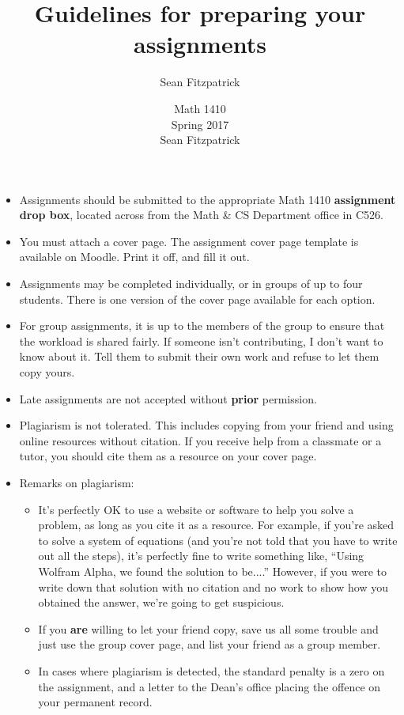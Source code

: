 \documentclass[letterpaper,12pt]{article}
\author{Sean Fitzpatrick}
\title{Guidelines for preparing your assignments}
\author{Math 1410\\Spring 2017\\Sean Fitzpatrick}
\begin{document}
\maketitle

\begin{itemize}
 \item Assignments should be submitted to the appropriate Math 1410 \textbf{assignment drop box}, located across from the Math \& CS Department office in C526.
 \item You must attach a cover page. The assignment cover page template is available on Moodle. Print it off, and fill it out.
 \item Assignments may be completed individually, or in groups of up to four students. There is one version of the cover page available for each option.
 \item For group assignments, it is up to the members of the group to ensure that the workload is shared fairly. If someone isn't contributing, I don't want to know about it. Tell them to submit their own work and refuse to let them copy yours.
 \item Late assignments are not accepted without {\bf prior} permission. 
 \item Plagiarism is not tolerated. This includes copying from your friend and using online resources without citation. If you receive help from a classmate or a tutor, you should cite them as a resource on your cover page.
 \item Remarks on plagiarism:
\begin{itemize}
 \item It's perfectly OK to use a website or software to help you solve a problem, as long as you cite it as a resource. For example, if you're asked to solve a system of equations (and you're not told that you have to write out all the steps), it's perfectly fine to write something like, ``Using Wolfram Alpha, we found the solution to be....'' However, if you were to write down that solution with no citation and no work to show how you obtained the answer, we're going to get suspicious.
 \item If you \textbf{are} willing to let your friend copy, save us all some trouble and just use the group cover page, and list your friend as a group member.
 \item In cases where plagiarism is detected, the standard penalty is a zero on the assignment, and a letter to the Dean's office placing the offence on your permanent record.
\end{itemize}

\end{itemize}
\end{document}
